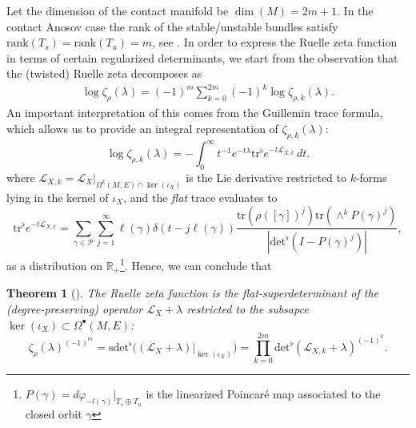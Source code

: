 \documentclass[reqno]{amsart}
\newtheorem{thm}{Theorem}[section]
\theoremstyle{definition}
\theoremstyle{remark}
\renewcommand{\phi}{\varphi}
\newcommand{\R}{\mathbb{R}}
\renewcommand{\L}{\mathcal{L}}
\newcommand{\tr}{\mathrm{tr}^\flat}
\renewcommand{\det}{\mathrm{det}^\flat}
\newcommand{\sdet}{\mathrm{sdet}^\flat}
\begin{document}
Let the dimension of the contact manifold be $\dim(M)=2m+1$. In the contact Anosov case the rank of the stable/unstable bundles satisfy $\mathrm{rank}(T_s)=\mathrm{rank}(T_u)=m$, see \cite{FaureTsujii_ContactAnosov}. In order to express the Ruelle zeta function in terms of certain regularized determinants, we start from the observation \cite{DyatlovZworski_RuelleZeta,hadfield_kandel_schiavina} that the (twisted) Ruelle zeta decomposes as 
\begin{align}
    \log \zeta_\rho(\lambda)
    = (-1)^m\sum_{k=0}^{2m} (-1)^k \log \zeta_{\rho,k}(\lambda).
\end{align}
An important interpretation of this comes from the Guillemin trace formula, which allows us to provide an integral representation of $\zeta_{\rho,k}(\lambda)$:
\begin{equation}\label{integralrepzeta}
    \log \zeta_{\rho, k}(\lambda) 
    = -\int_0^\infty 
    t^{-1}e^{-t\lambda} \tr e^{-t\L_{X,k}}
    \,dt.
\end{equation}
where $\L_{X,k} = \L_X\bigr|_{\Omega^k(M,E)\cap\ker(\iota_X)}$ is the Lie derivative restricted to $k$-forms lying in the kernel of $\iota_X$, and the \emph{flat} trace evaluates to \cite{guillemin1977lectures}
\begin{equation}\label{flattrace}
    \tr e^{-t\L_{X,k}}
    = \sum_{\gamma\in \mathcal{P}} \sum_{j=1}^\infty
    \ell(\gamma) \delta(t - j\ell(\gamma))
    \frac{\mathrm{tr}(\rho([\gamma])^j)\mathrm{tr} (\wedge^k P(\gamma)^j)}
    {| \det(I - P(\gamma)^j) |},
\end{equation}
as a distribution on $\R_+$\footnote{$P(\gamma)=d\phi_{-l(\gamma)}|_{T_s\oplus T_u}$ is the linearized Poincaré map associated to the closed orbit $\gamma$}. Hence, we can conclude that
\begin{thm}[\cite{DyatlovZworski_RuelleZeta,hadfield_kandel_schiavina}]\label{thm:Ruellezetadeterminant}
    The Ruelle zeta function is the flat-superdeterminant of the (degree-preserving) operator $\L_X + \lambda$ restricted to the subsapce $\ker(\iota_X) \subset \Omega^\bullet(M,E)$:
    \begin{equation}
    \label{Ruelleasadeterminant}
    \zeta_\rho (\lambda)^{(-1)^m} = \sdet\bigl((\L_{X} + \lambda)\bigr|_{\ker(\iota_X)}\bigr)  = \prod_{k=0}^{2m} {\det} (\L_{X,k} + \lambda)^{(-1)^k}.
    \end{equation}
\end{thm}
\end{document}
